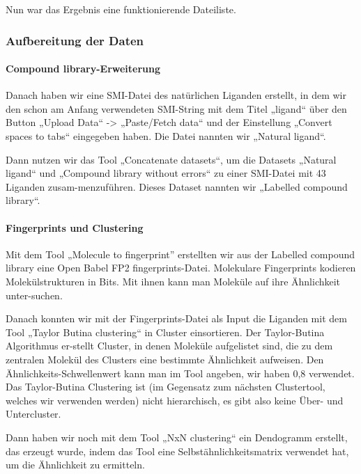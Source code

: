 \documentclass[11pt]{article}
\begin{document}
    Nun war das Ergebnis eine funktionierende Dateiliste.


    \subsubsection{Aufbereitung der Daten}\label{subsubsec:aufbereitung-der-daten}

    \paragraph{Compound library-Erweiterung}
    Danach haben wir eine SMI-Datei des natürlichen Liganden erstellt, in dem wir den schon am Anfang verwendeten SMI-String mit dem Titel „ligand“ über den Button „Upload Data“ -> „Paste/Fetch data“ und der Einstellung „Convert spaces to tabs“ eingegeben haben.
    Die Datei nannten wir „Natural ligand“.

    Dann nutzen wir das Tool „Concatenate datasets“, um die Datasets „Natural ligand“ und „Compound library without errors“ zu einer SMI-Datei mit 43 Liganden zusam-menzuführen.
    Dieses Dataset nannten wir „Labelled compound library“.

    \paragraph{Fingerprints und Clustering}
    Mit dem Tool „Molecule to fingerprint” erstellten wir aus der Labelled compound library eine Open Babel FP2 fingerprints-Datei.
    Molekulare Fingerprints kodieren Molekülstrukturen in Bits.
    Mit ihnen kann man Moleküle auf ihre Ähnlichkeit unter-suchen.

    Danach konnten wir mit der Fingerprints-Datei als Input die Liganden mit dem Tool „Taylor Butina clustering“ in Cluster einsortieren.
    Der Taylor-Butina Algorithmus er-stellt Cluster, in denen Moleküle aufgelistet sind, die zu dem zentralen Molekül des Clusters eine bestimmte Ähnlichkeit aufweisen.
    Den Ähnlichkeits-Schwellenwert kann man im Tool angeben, wir haben 0,8 verwendet.
    Das Taylor-Butina Clustering ist (im Gegensatz zum nächsten Clustertool, welches wir verwenden werden) nicht hierarchisch, es gibt also keine Über- und Untercluster.

    Dann haben wir noch mit dem Tool „NxN clustering“ ein Dendogramm erstellt, das erzeugt wurde, indem das Tool eine Selbstähnlichkeitsmatrix verwendet hat, um die Ähnlichkeit zu ermitteln.
\end{document}
